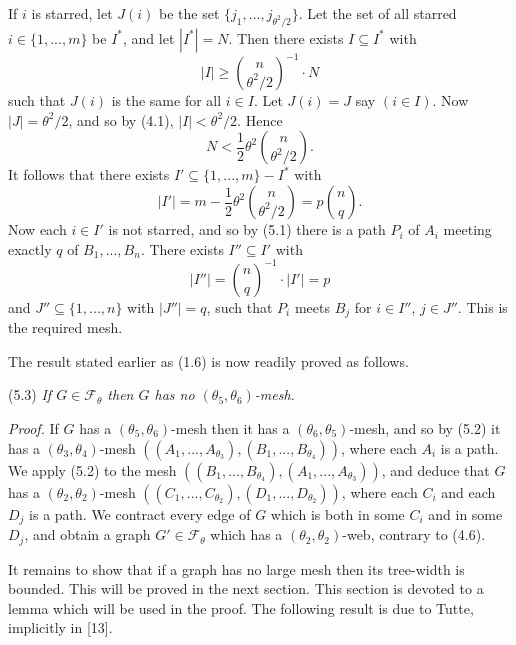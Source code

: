 If $i$ is starred, let $J(i)$ be the set $\{j_1, ..., j_{\theta^2/2}\}$. Let the set of all starred $i \in \{1, ..., m\}$ be $I^*$, and let $|I^*| = N$. Then there exists $I \subseteq I^*$ with
\begin{equation*}
|I| \ge \binom{n}{\theta^2/2}^{-1} \cdot N
\end{equation*}
such that $J(i)$ is the same for all $i \in I$. Let $J(i) = J$ say $(i \in I)$. Now $|J| = \theta^2/2$, and so by (4.1), $|I| < \theta^2/2$. Hence
\begin{equation*}
N < \frac{1}{2}\theta^2 \binom{n}{\theta^2/2}.
\end{equation*}
It follows that there exists $I' \subseteq \{1, ..., m\} - I^*$ with
\begin{equation*}
|I'| = m - \frac{1}{2}\theta^2 \binom{n}{\theta^2/2} = p \binom{n}{q}.
\end{equation*}
Now each $i \in I'$ is not starred, and so by (5.1) there is a path $P_i$ of $A_i$ meeting exactly $q$ of $B_1, ..., B_n$. There exists $I'' \subseteq I'$ with
\begin{equation*}
|I''| = \binom{n}{q}^{-1} \cdot |I'| = p
\end{equation*}
and $J'' \subseteq \{1, ..., n\}$ with $|J''| = q$, such that $P_i$ meets $B_j$ for $i \in I''$, $j \in J''$. This is the required mesh.

The result stated earlier as (1.6) is now readily proved as follows.

\stmt
(5.3) \textit{If $G \in \mathcal{F}_\theta$ then $G$ has no $(\theta_5, \theta_6)$-mesh.}

\textit{Proof.} If $G$ has a $(\theta_5, \theta_6)$-mesh then it has a $(\theta_6, \theta_5)$-mesh, and so by (5.2) it has a $(\theta_3, \theta_4)$-mesh $((A_1, ..., A_{\theta_3}), (B_1, ..., B_{\theta_4}))$, where each $A_i$ is a path. We apply (5.2) to the mesh $((B_1, ..., B_{\theta_4}), (A_1, ..., A_{\theta_3}))$, and deduce that $G$ has a $(\theta_2, \theta_2)$-mesh $((C_1, ..., C_{\theta_2}), (D_1, ..., D_{\theta_2}))$, where each $C_i$ and each $D_j$ is a path. We contract every edge of $G$ which is both in some $C_i$ and in some $D_j$, and obtain a graph $G' \in \mathcal{F}_\theta$ which has a $(\theta_2, \theta_2)$-web, contrary to (4.6).


It remains to show that if a graph has no large mesh then its tree-width is bounded. This will be proved in the next section. This section is devoted to a lemma which will be used in the proof. The following result is due to Tutte, implicitly in [13].
